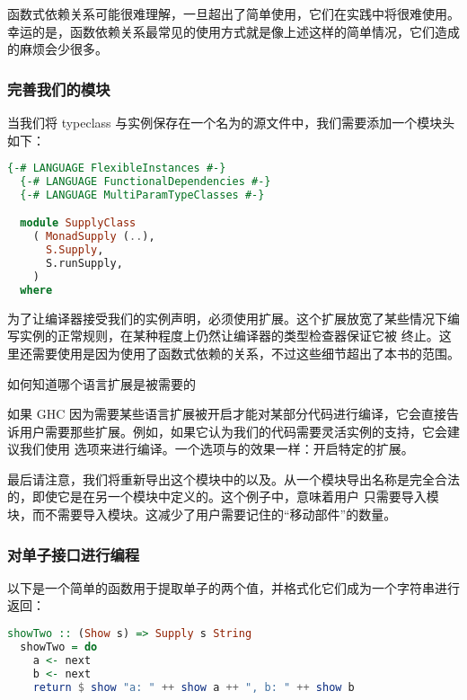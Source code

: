 \documentclass[./main.tex]{subfiles}
\begin{document}
函数式依赖关系可能很难理解，一旦超出了简单使用，它们在实践中将很难使用。幸运的是，函数依赖关系最常见的使用方式就是像上述这样的简单情况，它们造成的麻烦会少很多。

\subsubsection*{完善我们的模块}

当我们将 typeclass 与实例保存在一个名为的源文件中，我们需要添加一个模块头如下：

\begin{lstlisting}[language=Haskell]
  {-# LANGUAGE FlexibleInstances #-}
  {-# LANGUAGE FunctionalDependencies #-}
  {-# LANGUAGE MultiParamTypeClasses #-}

  module SupplyClass
    ( MonadSupply (..),
      S.Supply,
      S.runSupply,
    )
  where
\end{lstlisting}

为了让编译器接受我们的实例声明，必须使用扩展。这个扩展放宽了某些情况下编写实例的正常规则，在某种程度上仍然让编译器的类型检查器保证它被
终止。这里还需要使用是因为使用了函数式依赖的关系，不过这些细节超出了本书的范围。

\begin{anote}
  如何知道哪个语言扩展是被需要的

  如果 GHC 因为需要某些语言扩展被开启才能对某部分代码进行编译，它会直接告诉用户需要那些扩展。例如，如果它认为我们的代码需要灵活实例的支持，它会建议我们使用
  选项来进行编译。一个选项与的效果一样：开启特定的扩展。
\end{anote}

最后请注意，我们将重新导出这个模块中的以及。从一个模块导出名称是完全合法的，即使它是在另一个模块中定义的。这个例子中，意味着用户
只需要导入模块，而不需要导入模块。这减少了用户需要记住的“移动部件”的数量。

\subsubsection*{对单子接口进行编程}

以下是一个简单的函数用于提取单子的两个值，并格式化它们成为一个字符串进行返回：

\begin{lstlisting}[language=Haskell]
  showTwo :: (Show s) => Supply s String
  showTwo = do
    a <- next
    b <- next
    return $ show "a: " ++ show a ++ ", b: " ++ show b
\end{lstlisting}
\end{document}
